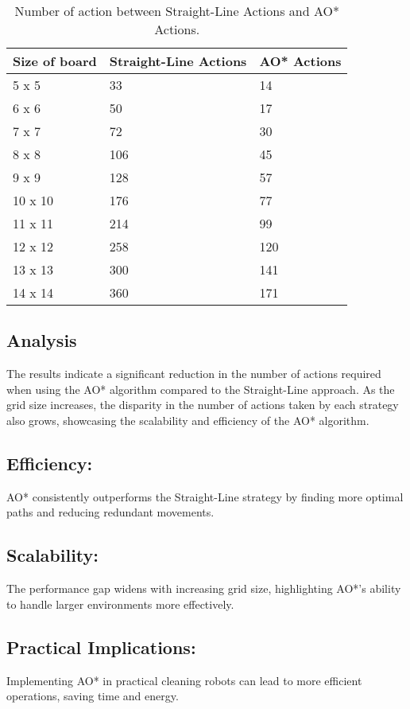 \documentclass{article}
\begin{document}
\begin{table}[h]\centering
  \begin{tabular}{lll}
    \toprule
    Size of board& Straight-Line Actions & AO{*} Actions\\
    \midrule
    5 x 5& 33 & 14\\
    \midrule
    6 x 6& 50&17\\
    \midrule
    7 x 7& 72&30\\
    \midrule
    8 x 8&106&45\\
    \midrule
    9 x 9& 128&57\\
    \midrule
    10 x 10& 176& 77\\
    \midrule
    11 x 11& 214& 99\\
    \midrule
    12 x 12& 258& 120\\
    \midrule
    13 x 13& 300& 141\\
    \midrule
    14 x 14& 360& 171\\
     
    \bottomrule
  \end{tabular}
  \caption{Number of action between Straight-Line Actions and AO{*} Actions. }
  \label{tab:resultsEasy}
\end{table}
 
 
\subsection{Analysis}
The results indicate a significant reduction in the number of actions required when using the AO* algorithm compared to the Straight-Line approach. As the grid size increases, the disparity in the number of actions taken by each strategy also grows, showcasing the scalability and efficiency of the AO* algorithm.

\subsection{Efficiency:} AO* consistently outperforms the Straight-Line strategy by finding more optimal paths and reducing redundant movements.
\subsection{Scalability:} The performance gap widens with increasing grid size, highlighting AO*'s ability to handle larger environments more effectively.
\subsection{Practical Implications:} Implementing AO* in practical cleaning robots can lead to more efficient operations, saving time and energy.
\end{document}
